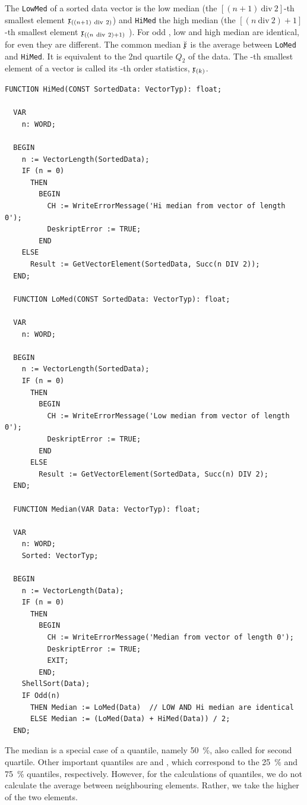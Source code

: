 \begin{refsection}
The \texttt{LowMed} of a sorted data vector is the low median (the \( [(n+1)\ \mathrm{div}\ 2] \)-th smallest element \( \AbsVec{x}_{\left((n+1)\ \mathrm{div}\ 2\right)} \)) and \texttt{HiMed} the high median (the \( [(n\ \mathrm{div}\ 2) + 1] \)-th smallest element \( \AbsVec{x}_{\left((n\ \mathrm{div}\ 2) + 1\right)} \) ). For odd , low and high median are identical, for even  they are different. The common median \( \breve{\mathfrak{x}} \) is the average between \texttt{LoMed} and \texttt{HiMed}. It is equivalent to the 2nd quartile \(Q_2 \) of the data. The -th smallest element of a vector  is called its -th order statistics, \( \mathfrak{x}_{(k)} \).

\begin{lstlisting}[caption=Median of a data vector]
  FUNCTION HiMed(CONST SortedData: VectorTyp): float;

  VAR
    n: WORD;

  BEGIN
    n := VectorLength(SortedData);
    IF (n = 0)
      THEN
        BEGIN
          CH := WriteErrorMessage('Hi median from vector of length 0');
          DeskriptError := TRUE;
        END
    ELSE
      Result := GetVectorElement(SortedData, Succ(n DIV 2));
  END;

  FUNCTION LoMed(CONST SortedData: VectorTyp): float;

  VAR
    n: WORD;

  BEGIN
    n := VectorLength(SortedData);
    IF (n = 0)
      THEN
        BEGIN
          CH := WriteErrorMessage('Low median from vector of length 0');
          DeskriptError := TRUE;
        END
      ELSE
        Result := GetVectorElement(SortedData, Succ(n) DIV 2);
  END;

  FUNCTION Median(VAR Data: VectorTyp): float;

  VAR
    n: WORD;
    Sorted: VectorTyp;

  BEGIN
    n := VectorLength(Data);
    IF (n = 0)
      THEN
        BEGIN
          CH := WriteErrorMessage('Median from vector of length 0');
          DeskriptError := TRUE;
          EXIT;
        END;
    ShellSort(Data);
    IF Odd(n)
      THEN Median := LoMed(Data)  // LOW AND Hi median are identical
      ELSE Median := (LoMed(Data) + HiMed(Data)) / 2;
  END;
\end{lstlisting}

The median is a special case of a quantile, namely \SI{50}{\%}, also called  for second quartile. Other important quantiles are  and , which correspond to the \SI{25}{\%} and \SI{75}{\%} quantiles, respectively. However, for the calculations of quantiles, we do not calculate the average between neighbouring elements. Rather, we take the higher of the two elements.


\end{refsection}
